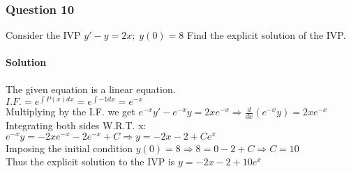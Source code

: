 \documentclass{article}
\begin{document}
\subsubsection{Question 10}
Consider the IVP $y'-y=2x;\;y(0)=8$
Find the explicit solution of the IVP.

\paragraph{Solution}
The given equation is a linear equation.
\\$I.F.=e^{\int P(x)dx}=e^{\int -1dx}=e^{-x}$
\\Multiplying by the I.F. we get $e^{-x}y'-e^{-x}y=2xe^{-x}
\Rightarrow\frac{d}{dx}(e^{-x}y)=2xe^{-x}$
\\Integrating both sides W.R.T. x: $e^{-x}y=-2xe^{-x}-2e^{-x}+C\Rightarrow y=-2x-2+Ce^x$
\\Imposing the initial condition $y(0)=8\Rightarrow 8=0-2+C\Rightarrow C=10$
\\Thus the explicit solution to the IVP is $y=-2x-2+10e^x$

\end{document}
